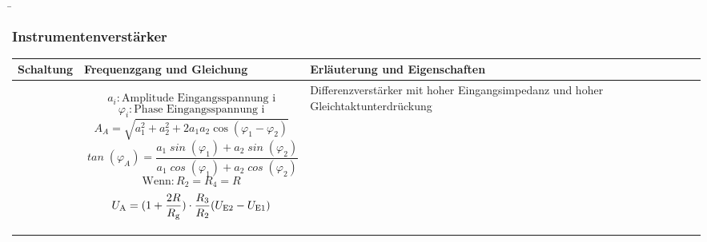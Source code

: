 
\begin{frame}
    \b{
        \frametitle{Instrumentenverstärker}
    \centering
    \begin{table}[ht]
    \label{tab:Instrumentenverstaerker}
    \begin{tabular}{|m{}|m{}|m{}|}
    \hline
    Schaltung & Frequenzgang und Gleichung & Erläuterung und Eigenschaften\\ %
    \hline
    \vspace{0.5cm}
    \centering
    
     &
         \begin{center}
   
\end{center}

\vspace{1ex}
\[
\mathit{a_i} : \text{Amplitude Eingangsspannung i}
\]
\[
\mathit{\varphi_i} : \text{Phase Eingangsspannung i}
\]
\[
\mathit{A}_{A} = \sqrt{a_1^2 + a_2^2 + 2a_1a_2 \cos(\varphi_1 - \varphi_2)}
\]
\[
\mathit{\tan}(\varphi_A) = \frac{a_1 \mathit{\sin}(\varphi_1) + a_2 \mathit{\sin}(\varphi_2)}{a_1 \mathit{\cos}(\varphi_1) + a_2 \mathit{\cos}(\varphi_2)}
\]
\[
    \text{Wenn} : R_2 = R_4 = R
\]
\[
    U_{\textnormal{A}} = (1+ \frac{2R} {R_{\textnormal{g}}}) \cdot \frac{R_3} {R_2} (U_{\textnormal{E2}}-U_{\textnormal{E1}})
\]
     & 
    Differenzverstärker mit hoher Eingangsimpedanz und hoher Gleichtaktunterdrückung  
 \\
    \hline
    \end{tabular}
    \end{table}
    }
\end{frame}



